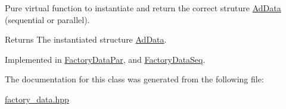 \-Pure virtual function to instantiate and return the correct struture \hyperlink{classAdData}{\-Ad\-Data} (sequential or parallel). 

\begin{DoxyReturn}{\-Returns}
\-The instantiated structure \hyperlink{classAdData}{\-Ad\-Data}. 
\end{DoxyReturn}


\-Implemented in \hyperlink{classFactoryDataPar_a90e41820a2c94e76c947f4a4ee7809fb}{\-Factory\-Data\-Par}, and \hyperlink{classFactoryDataSeq_ac229b96239d9041f856fe63dcfc6c24f}{\-Factory\-Data\-Seq}.



\-The documentation for this class was generated from the following file\-:\begin{DoxyCompactItemize}
\item 
\hyperlink{factory__data_8hpp}{factory\-\_\-data.\-hpp}\end{DoxyCompactItemize}
